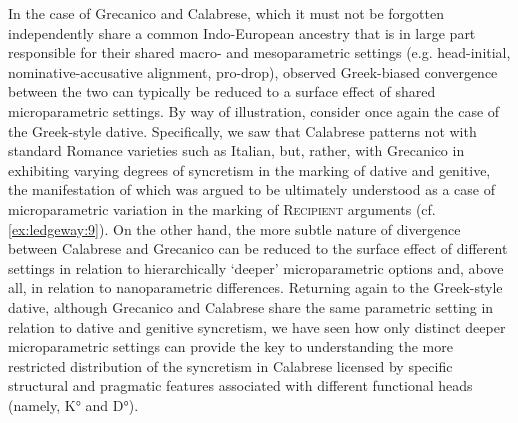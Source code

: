 \documentclass[output=paper,modfonts,nonflat,colorlinks,citecolor=brown]{langsci/langscibook}
\begin{document}
In the case of Grecanico and Calabrese, which it must not be forgotten independently share a common Indo-European ancestry that is in large part responsible for their shared macro- and mesoparametric settings (e.g. head-initial, nominative-accusative alignment, pro-drop), observed Greek-biased convergence between the two can typically be reduced to a surface effect of shared microparametric settings. By way of illustration, consider once again the case of the Greek-style dative. Specifically, we saw that Calabrese patterns not with standard Romance varieties such as Italian, but, rather, with Grecanico in exhibiting varying degrees of syncretism in the marking of dative and genitive, the manifestation of which was argued to be ultimately understood as a case of microparametric variation in the marking of \textsc{Recipient} arguments (cf. \ref{ex:ledgeway:9}). On the other hand, the more subtle nature of divergence between Calabrese and Grecanico can be reduced to the surface effect of different settings in relation to hierarchically `deeper' microparametric options and, above all, in relation to nanoparametric differences. Returning again to the Greek-style dative, although Grecanico and Calabrese share the same parametric setting in relation to dative and genitive syncretism, we have seen how only distinct deeper microparametric settings can provide the key to understanding the more restricted distribution of the syncretism in Calabrese licensed by specific structural and pragmatic features associated with different functional heads (namely, K° and D°).
\end{document}
